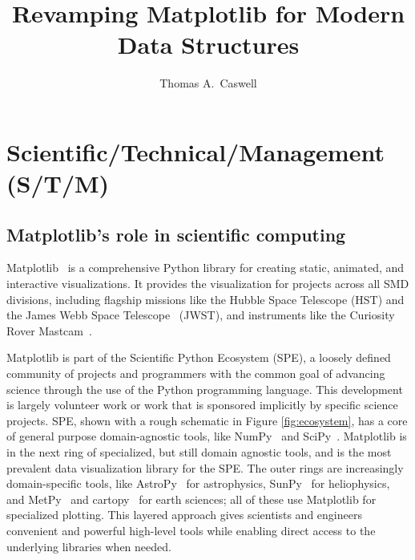 \documentclass[12pt]{article}
\numberwithin{page}{section}
\begin{document}
\title{Revamping Matplotlib for Modern Data Structures}
\author{Thomas A.\ Caswell}
\date{}
\maketitle

\setcounter{tocdepth}{2}
\tableofcontents
\thispagestyle{empty}
\newpage

\section{Scientific/Technical/Management (S/T/M)}
\setcounter{page}{1}

\subsection{Matplotlib's role in scientific computing}

Matplotlib~\cite{Hunter:2007} is a comprehensive Python library for
creating static, animated, and interactive visualizations.  It
provides the visualization for projects across all SMD divisions,
including flagship missions like the Hubble Space Telescope (HST) and
the James Webb Space Telescope~\cite{jwst_pipeline} (JWST), and
instruments like the Curiosity Rover
Mastcam~\cite{https://doi.org/10.1002/2016EA000219}.

Matplotlib is part of the Scientific Python Ecosystem (SPE), a loosely
defined community of projects and programmers with the common goal of
advancing science through the use of the Python programming language.
This development is largely volunteer work or work that is sponsored
implicitly by specific science projects.  SPE, shown with a rough
schematic in Figure \ref{fig:ecosystem}, has a core of general purpose
domain-agnostic tools, like NumPy~\cite{Harris2020} and
SciPy~\cite{Virtanen2020}. Matplotlib is in the next ring of
specialized, but still domain agnostic tools, and is the most
prevalent data visualization library for the SPE.  The outer rings are
increasingly domain-specific tools, like
AstroPy~\cite{astropy:2013,
  astropy:2018} for astrophysics,
SunPy~\cite{sunpy_community2020}  for heliophysics, and
MetPy~\cite{metpy} and cartopy~\cite{Cartopy} for earth sciences; all of these use
Matplotlib for specialized plotting.  This layered approach gives
scientists and engineers convenient and powerful high-level tools
while enabling direct access to the underlying libraries when needed.
\end{document}
